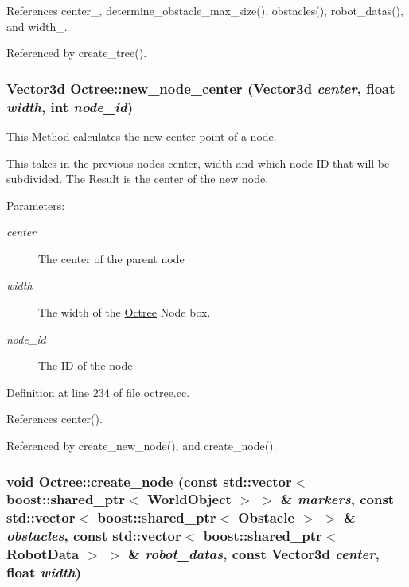 References center\_\-, determine\_\-obstacle\_\-max\_\-size(), obstacles(), robot\_\-datas(), and width\_\-.

Referenced by create\_\-tree().\hypertarget{class_octree_65c7cdf803bfb02dab9681ff6bc03520}{
\subsubsection[new\_\-node\_\-center]{\setlength{\rightskip}{0pt plus 5cm}Vector3d Octree::new\_\-node\_\-center (Vector3d {\em center}, \/  float {\em width}, \/  int {\em node\_\-id})}}
\label{class_octree_65c7cdf803bfb02dab9681ff6bc03520}


This Method calculates the new center point of a node. 

This takes in the previous nodes center, width and which node ID that will be subdivided. The Result is the center of the new node. \begin{Desc}
\item[Parameters:]
\begin{description}
\item[{\em center}]The center of the parent node \item[{\em width}]The width of the \hyperlink{class_octree}{Octree} Node box. \item[{\em node\_\-id}]The ID of the node \end{description}
\end{Desc}


Definition at line 234 of file octree.cc.

References center().

Referenced by create\_\-new\_\-node(), and create\_\-node().\hypertarget{class_octree_7eb807d724b4caa99d723d07c1d1f4a6}{
\subsubsection[create\_\-node]{\setlength{\rightskip}{0pt plus 5cm}void Octree::create\_\-node (const std::vector$<$ boost::shared\_\-ptr$<$ {\bf WorldObject} $>$ $>$ \& {\em markers}, \/  const std::vector$<$ boost::shared\_\-ptr$<$ Obstacle $>$ $>$ \& {\em obstacles}, \/  const std::vector$<$ boost::shared\_\-ptr$<$ {\bf RobotData} $>$ $>$ \& {\em robot\_\-datas}, \/  const Vector3d {\em center}, \/  float {\em width})}}
\label{class_octree_7eb807d724b4caa99d723d07c1d1f4a6}


